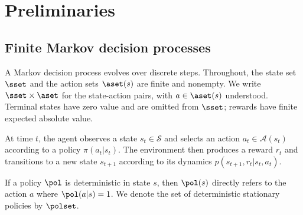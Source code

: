 
\section{Preliminaries}
\label{sec: mcopi}




\subsection{Finite Markov decision processes}




























A Markov decision process evolves over discrete steps.
Throughout, the state set $\sset$ and the action sets $\aset(s)$ are finite and nonempty. We write $\sset\times\aset$ for the state-action pairs, with $a\in\aset(s)$ understood. Terminal states have zero value and are omitted from $\sset$; rewards have finite expected absolute value.

At time \(t\), the agent observes a state \(s_t \in \mathcal S\) and selects an action \(a_t \in \mathcal A(s_t)\) according to a policy \(\pi(a_t | s_t)\).
The environment then produces a reward \(r_t\) and transitions to a new state \(s_{t+1}\) according to its dynamics $p(s_{t+1}, r_t | s_t, a_t)$.



If a policy $\pol$ is deterministic in state $s$, then $\pol(s)$ directly refers to the action $a$ where $\pol(a | s) = 1$.
We denote the set of deterministic stationary policies by $\polset$.







































